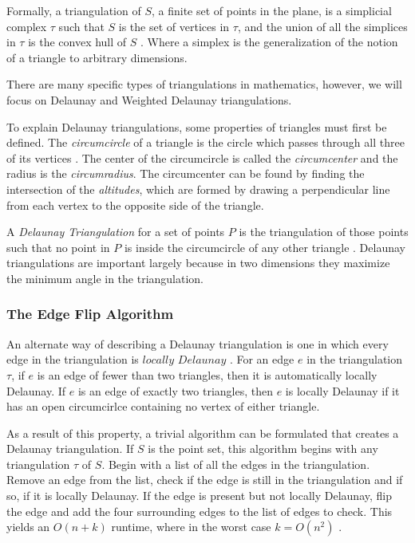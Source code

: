 \documentclass[11pt]{article}
\begin{document}
Formally, a triangulation of $S$, a finite set of points in the plane, is a simplicial complex $\tau$ such that $S$ is the set of vertices in $\tau$, and the union of all the simplices in $\tau$ is the convex hull of $S$ \cite{meshGeneration}. Where a simplex is the generalization of the notion of a triangle to arbitrary dimensions.

There are many specific types of triangulations in mathematics, however, we will focus on Delaunay and Weighted Delaunay triangulations.

To explain Delaunay triangulations, some properties of triangles must first be defined. The \emph{circumcircle} of a triangle is the circle which passes through all three of its vertices \cite{mathworld:Circumcenter}. The center of the circumcircle is called the \emph{circumcenter} and the radius is the \emph{circumradius}. The circumcenter can be found by finding the intersection of the \emph{altitudes}, which are formed by drawing a perpendicular line from each vertex to the opposite side of the triangle.
  
A \emph{Delaunay Triangulation} for a set of points $P$ is the triangulation of those points such that no point in $P$ is inside the circumcircle of any other triangle \cite{meshGeneration}. Delaunay triangulations are important largely because in two dimensions they maximize the minimum angle in the triangulation.

\subsubsection{The Edge Flip Algorithm}
An alternate way of describing a Delaunay triangulation is one in which every edge in the triangulation is $locally$ $Delaunay$ \cite{meshGeneration}. For an edge $e$ in the triangulation $\tau$, if $e$ is an edge of fewer than two triangles, then it is automatically locally Delaunay. If $e$ is an edge of exactly two triangles, then $e$ is locally Delaunay if it has an open circumcirlce containing no vertex of either triangle. 

As a result of this property, a trivial algorithm can be formulated that creates a Delaunay triangulation. If $S$ is the point set, this algorithm begins with any triangulation $\tau$ of $S$. Begin with a list of all the edges in the triangulation. Remove an edge from the list, check if the edge is still in the triangulation and if so, if it is locally Delaunay. If the edge is present but not locally Delaunay, flip the edge and add the four surrounding edges to the list of edges to check. This yields an $O(n + k)$ runtime, where in the worst case $k = O(n^2)$ \cite{meshGeneration}.
\end{document}
